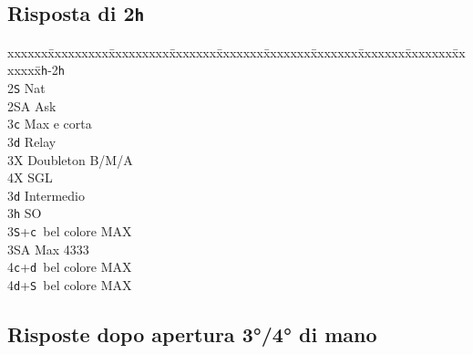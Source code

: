 \documentclass[a4paper,italian]{article}
\newcommand{\BS}{\small{\texttt{S}}}
\newcommand{\BC}{\small{\texttt{c}}}
\newcommand{\BD}{\small{\texttt{d}}}
\newcommand{\BH}{\small{\texttt{h}}}
\newcommand{\pdfh}{\texorpdfstring{\texttt{h}}{H}}
\newenvironment{bidtable}
{\begin{tabbing}

    xxxxxx\=xxxxxxxxx\=xxxxxxxxx\=xxxxxxx\=xxxxxxx\=xxxxxxx\=xxxxxxx\=xxxxxxx\=xxxxxxx\=xxxxxxx\=\kill}
{\end{tabbing} }%
\begin{document}
\begin{multicols}{2}
    \subsection{Risposta di 2\pdfh}

    \begin{bidtable}
        1\BH-2\BH\+\\
        2\BS \> Nat\\
        2\small{SA} \> Ask\+\\
        3\BC \> Max e corta\+\\
        3\BD \> Relay\+\\
        3X \> Doubleton B/M/A\\
        4X \> SGL\-\-\\
        3\BD \> Intermedio\\
        3\BH \> SO\\
        3\BS {}+\BC\ bel colore MAX\\
        3\small{SA} \> Max 4333\\
        4\BC {}+\BD\ bel colore MAX\\
        4\BD {}+\BS\ bel colore MAX\-\-
    \end{bidtable}
    \columnbreak

    \subsection{Risposte dopo apertura 3°/4° di mano}


\end{multicols}
\end{document}
